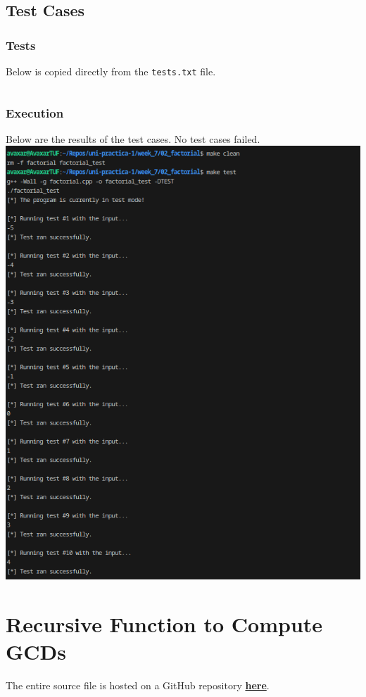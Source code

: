 \documentclass[12pt]{article}
\begin{document}
\subsection{Test Cases}

\subsubsection{Tests}
Below is copied directly from the \texttt{tests.txt} file.
\inputminted{text}{02_factorial/tests.txt}

\subsubsection{Execution}
Below are the results of the test cases. No test cases failed.
\newline\includegraphics[width=\textwidth]{02_factorial_test}

\pagebreak
\section{Recursive Function to Compute GCDs}
The entire source file is hosted on a GitHub repository \href{https://github.com/avaxar/uni-practica-1/tree/main/week_7/03_gcd}{\textbf{here}}.
\end{document}

